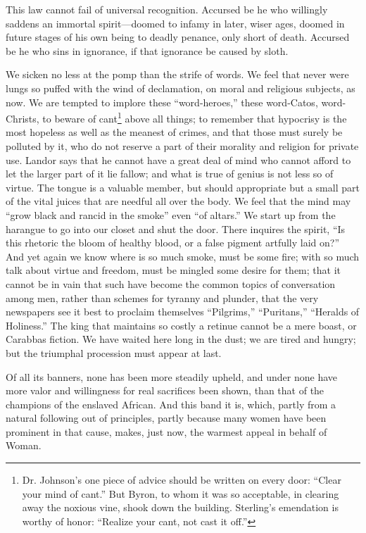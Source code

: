 This law cannot fail of universal recognition. Accursed be he who
willingly saddens an immortal spir\-it---doomed to infamy in later,
wiser ages, doomed in future stages of his own being to deadly
penance, only short of death. Accursed be he who sins in ignorance, if
that ignorance be caused by sloth.

We sicken no less at the pomp than the strife of words. We feel that
never were lungs so puffed with the wind of declamation, on moral and
religious subjects, as now. We are tempted to implore these
``word-heroes,'' these word-Catos, word-Christs, to beware of
cant\footnote{Dr. Johnson's one piece of advice should be written on
every door: ``Clear your mind of cant.'' But Byron, to whom it was so
acceptable, in clearing away the noxious vine, shook down the
building. Sterling's emendation is worthy of honor: ``Realize your
cant, not cast it off.''} above all things; to remember that hypocrisy
is the most hopeless as well as the meanest of crimes, and that those
must surely be polluted by it, who do not reserve a part of their
morality and religion for private use. Landor says that he cannot have
a great deal of mind who cannot afford to let the larger part of it
lie fallow; and what is true of genius is not less so of virtue. The
tongue is a valuable member, but should appropriate but a small part
of the vital juices that are needful all over the body. We feel that
the mind may  ``grow black and rancid in the smoke'' even
``of altars.'' We start up from the harangue to go into our closet and
shut the door. There inquires the spirit, ``Is this rhetoric the bloom
of healthy blood, or a false pigment artfully laid on?'' And yet again
we know where is so much smoke, must be some fire; with so much talk
about virtue and freedom, must be mingled some desire for them; that
it cannot be in vain that such have become the common topics of
conversation among men, rather than schemes for tyranny and plunder,
that the very newspapers see it best to proclaim themselves
``Pilgrims,'' ``Puritans,'' ``Heralds of Holiness.'' The king that
maintains so costly a retinue cannot be a mere boast, or Carabbas
fiction. We have waited here long in the dust; we are tired and
hungry; but the triumphal procession must appear at last.

Of all its banners, none has been more steadily upheld, and under none
have more valor and willingness for real sacrifices been shown, than
that of the champions of the enslaved African. And this band it is,
which, partly from a natural following out of principles, partly
because many women have been prominent in that cause, makes, just now,
the warmest appeal in behalf of Woman.

